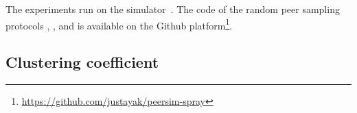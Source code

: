 The experiments run on the \PEERSIM
simulator~\cite{montresor2009peersim}. The code of the random peer sampling
protocols \CYCLON, \SCAMP, and \SPRAY is available on the Github
platform\footnote{\url{https://github.com/justayak/peersim-spray}}.

\subsection{Clustering coefficient}
\label{subsec:cluster}


